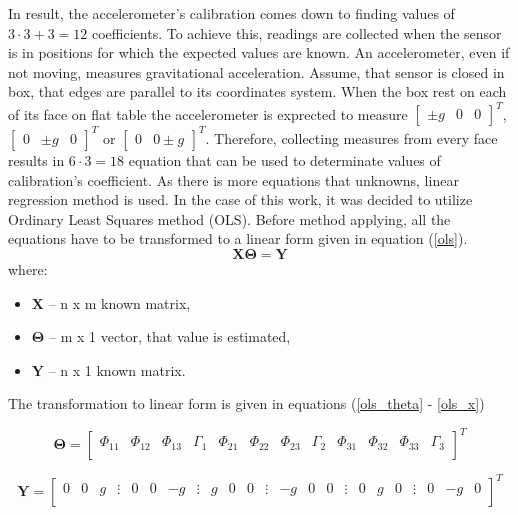 In result, the accelerometer's calibration comes down to finding values of $3 \cdot 3 + 3 = 12$ coefficients. To achieve this, readings are collected when the sensor is in positions for which the expected values are known. An accelerometer, even if not moving, measures gravitational acceleration. Assume, that sensor is closed in box, that edges are parallel to its coordinates system. When the box rest on each of its face on flat table the accelerometer is exprected to measure $\begin{bmatrix}\pm g & 0 & 0\end{bmatrix}^T$, $\begin{bmatrix}0 & \pm g & 0\end{bmatrix}^T$ or $\begin{bmatrix} 0 & 0 \pm g\end{bmatrix}^T$. Therefore, collecting measures from every face results in $6 \cdot 3 = 18$ equation that can be used to determinate values of calibration's coefficient. As there is more equations that unknowns, linear regression method is used. In the case of this work, it was decided to utilize Ordinary Least Squares method (OLS). Before method applying, all the equations have to be transformed to a linear form given in equation (\ref{ols}).
\begin{equation}
	\bm{X} \bm{\Theta} = \bm{Y}
	\label{ols}
\end{equation}
where:
\begin{itemize}
	\item $\bm{X}$ -- n x m known matrix,
	\item $\bm{\Theta}$ -- m x 1 vector, that value is estimated,
	\item $\bm{Y}$ -- n x 1 known matrix.
\end{itemize}
 
The transformation to linear form is given in equations (\ref{ols_theta} - \ref{ols_x})
\setcounter{MaxMatrixCols}{25}

\begin{equation}
	\bm{\Theta} = \begin{bmatrix} \Phi_{11} & \Phi_{12} & \Phi_{13} & \Gamma_1 & \Phi_{21} & \Phi_{22} & \Phi_{23} & \Gamma_2 & \Phi_{31} & \Phi_{32} & \Phi_{33} & \Gamma_3 \\
	\end{bmatrix}^T
	\label{ols_theta}
\end{equation}


\begin{equation}
	\bm{Y} = \begin{bmatrix} 0 & 0 & g & \vdots & 0 & 0 & -g & \vdots & g & 0 & 0 & \vdots & -g & 0 & 0  & \vdots& 0 & g & 0 & \vdots & 0 & -g & 0 \\
	\end{bmatrix}^T
	\label{ols_y}
\end{equation}


